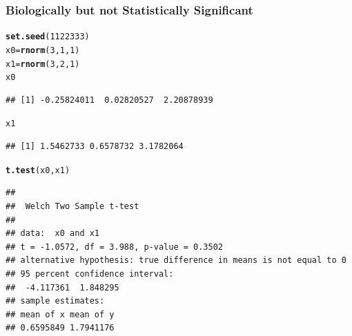 \documentclass[xcolor=x11names,compress]{beamer}\usepackage[]{graphicx}\usepackage[]{color}
\makeatletter
\newcommand{\hlnum}[1]{\textcolor[rgb]{0.686,0.059,0.569}{#1}}%
\newcommand{\hlstd}[1]{\textcolor[rgb]{0.345,0.345,0.345}{#1}}%
\newcommand{\hlkwb}[1]{\textcolor[rgb]{0.69,0.353,0.396}{#1}}%
\newcommand{\hlkwd}[1]{\textcolor[rgb]{0.737,0.353,0.396}{\textbf{#1}}}%
\newenvironment{kframe}{%
 \def\at@end@of@kframe{}%
 \ifinner\ifhmode%
  \def\at@end@of@kframe{\end{minipage}}%
  \begin{minipage}{\columnwidth}%
 \fi\fi%
 \def\FrameCommand##1{\hskip\@totalleftmargin \hskip-\fboxsep
 \colorbox{shadecolor}{##1}\hskip-\fboxsep
     \hskip-\linewidth \hskip-\@totalleftmargin \hskip\columnwidth}%
 \MakeFramed {\advance\hsize-\width
   \@totalleftmargin\z@ \linewidth\hsize
   \@setminipage}}%
 {\par\unskip\endMakeFramed%
 \at@end@of@kframe}
\newenvironment{knitrout}{}{} %
\makeatother
\begin{document}
\begin{frame}[containsverbatim]
\frametitle{Biologically but not Statistically Significant}
\begin{small}
\begin{knitrout}\tiny
{}\color{fgcolor}\begin{kframe}
\begin{alltt}
\hlkwd{set.seed}\hlstd{(}\hlnum{1122333}\hlstd{)}
\hlstd{x0}\hlkwb{=}\hlkwd{rnorm}\hlstd{(}\hlnum{3}\hlstd{,}\hlnum{1}\hlstd{,}\hlnum{1}\hlstd{)}
\hlstd{x1}\hlkwb{=}\hlkwd{rnorm}\hlstd{(}\hlnum{3}\hlstd{,}\hlnum{2}\hlstd{,}\hlnum{1}\hlstd{)}
\hlstd{x0}
\end{alltt}
\begin{verbatim}
## [1] -0.25824011  0.02820527  2.20878939
\end{verbatim}
\begin{alltt}
\hlstd{x1}
\end{alltt}
\begin{verbatim}
## [1] 1.5462733 0.6578732 3.1782064
\end{verbatim}
\begin{alltt}
\hlkwd{t.test}\hlstd{(x0,x1)}
\end{alltt}
\begin{verbatim}
## 
## 	Welch Two Sample t-test
## 
## data:  x0 and x1
## t = -1.0572, df = 3.988, p-value = 0.3502
## alternative hypothesis: true difference in means is not equal to 0
## 95 percent confidence interval:
##  -4.117361  1.848295
## sample estimates:
## mean of x mean of y 
## 0.6595849 1.7941176
\end{verbatim}
\end{kframe}
\end{knitrout}
\end{small}

\end{frame}
\end{document}
